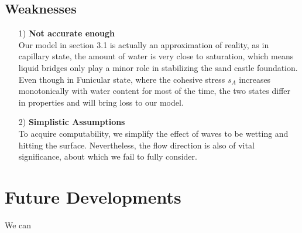 \documentclass[12pt]{article}
\begin{document}
\subsection{Weaknesses}
\begin{itemize}
    \item [1)]
    \textbf{Not accurate enough}\\
    Our model in section 3.1 is actually an approximation of reality, as in capillary state, the amount of water is very close to saturation, which means liquid bridges only play a minor role in stabilizing the sand castle foundation. Even though in Funicular state, where the cohesive stress $s_A$ increases monotonically with water content for most of the time, the two states differ in properties and will bring loss to our model.
    \item [2)]
    \textbf{Simplistic Assumptions}\\
    To acquire computability, we simplify the effect of waves to be wetting and hitting the surface. Nevertheless, the flow direction is also of vital significance, about which we fail to fully consider.
    
\end{itemize}

\section{Future Developments}
\par 
We can 






\newpage
\begin{appendix}
    \listoffigures
    \listoftables
    \listoflistings
    \printbibliography
\end{appendix}
\end{document}
